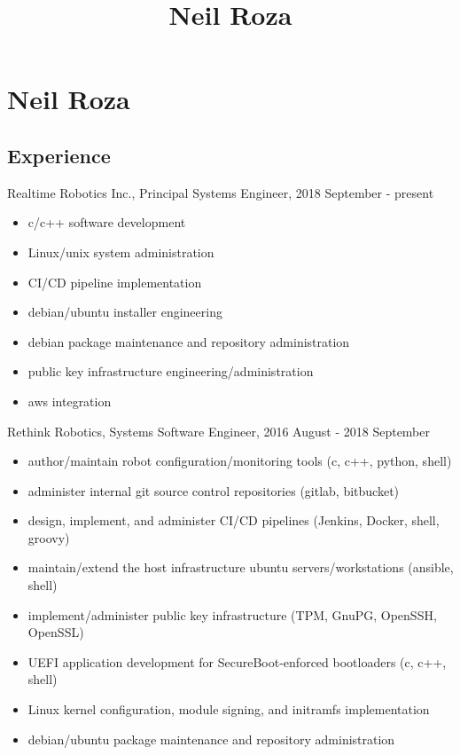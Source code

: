 \documentclass[letterpaper,10pt]{article}
\title{Neil Roza}
\begin{document}
\pagestyle{empty}

\section*{Neil Roza}



\subsection*{Experience}

Realtime Robotics Inc., Principal Systems Engineer, 2018 September - present

\begin{itemize}
\itemsep0em
\item c/c++ software development
\item Linux/unix system administration
\item CI/CD pipeline implementation
\item debian/ubuntu installer engineering
\item debian package maintenance and repository administration
\item public key infrastructure engineering/administration
\item aws integration
\end{itemize}

Rethink Robotics, Systems Software Engineer, 2016 August - 2018 September

\begin{itemize}
  \itemsep0em
\item author/maintain robot configuration/monitoring tools (c, c++, python,
  shell)
\item administer internal git source control repositories (gitlab, bitbucket)
\item design, implement, and administer CI/CD pipelines (Jenkins, Docker,
  shell, groovy)
\item maintain/extend the host infrastructure ubuntu servers/workstations (ansible,
  shell)
\item implement/administer public key infrastructure (TPM, GnuPG, OpenSSH,
  OpenSSL)
\item UEFI application development for SecureBoot-enforced bootloaders (c, c++,
  shell)
\item Linux kernel configuration, module signing, and initramfs implementation
\item debian/ubuntu package maintenance and repository administration
\end{itemize}
\end{document}

